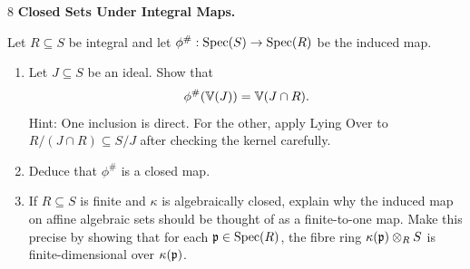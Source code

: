 \documentclass[Notebook.tex]{subfiles}
\begin{document}
\newpage 

\begin{problem}{8}
    \textbf{Closed Sets Under Integral Maps.} 
    
    Let $R\subseteq S$ be integral and let $\phi^{\#}:\operatorname{Spec}(S)\to\operatorname{Spec}(R)$ be the induced map.
    \begin{enumerate}
        \item Let $J\subseteq S$ be an ideal. Show that
        \[
        \phi^{\#}(\mathbb V(J))=\mathbb V(J\cap R).
        \]
        Hint: One inclusion is direct. For the other, apply Lying Over to $R/(J\cap R)\subseteq S/J$ after checking the kernel carefully.
        \item Deduce that $\phi^{\#}$ is a closed map.
        \item If $R\subseteq S$ is finite and $\kappa$ is algebraically closed, explain why the induced map on affine algebraic sets should be thought of as a finite-to-one map. Make this precise by showing that for each $\operatorname{\mathfrak{p}}\in\operatorname{Spec}(R)$, the fibre ring $\kappa(\operatorname{\mathfrak{p}})\otimes_R S$ is finite-dimensional over $\kappa(\operatorname{\mathfrak{p}})$.
    \end{enumerate}    
\end{problem}
\end{document}
